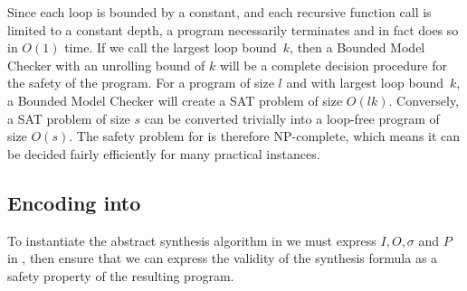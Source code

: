 \iffalse
Two example \newC programs are shown 
in Fig.~\ref{fig:c-}.

\begin{figure}
\begin{minipage}[scale=0.8]{0.45\linewidth}
 \begin{lstlisting}[language=c]
int count_bits(int x) {
  int i, ret = 0;
  
  for (i = 0; i < 32; i++)
    if (x & (1 << i))
      ret++;
  
  return ret;
}
 \end{lstlisting}
\end{minipage}
\begin{minipage}{0.54\linewidth}
 \begin{lstlisting}[language=C]
int common_factor(int A[10]) {
  int i, factor = nondet();

  for (i = 0; i < 10; i++)
    assume((A[i] % factor) == 0);

  assume(factor > 1);
  return factor;
}

 \end{lstlisting}
\end{minipage}

 \caption{Two \newC programs}
 \label{fig:c-}

\end{figure}
\fi

Since each loop is bounded by a constant, and each recursive function call is
limited to a constant depth, a \newC program necessarily terminates and in
fact does so in $O(1)$ time.  If we call the largest loop bound~$k$, then
a Bounded Model Checker with an unrolling bound of $k$ will be a complete
decision procedure for the safety of the program.  For a \newC program of
size $l$ and with largest loop bound~$k$, a Bounded Model Checker will
create a SAT problem of size $O(lk)$.  Conversely, a SAT problem
of size $s$ can be converted trivially into a loop-free \newC program
of size $O(s)$.  The safety problem for \newC is therefore NP-complete,
which means it can be decided fairly efficiently for many practical
instances.


\subsection{Encoding into \newC}
To instantiate the abstract synthesis algorithm in \newC we must express $I, O,
\sigma$ and $P$ in \newC, then ensure that we can express the validity of the
synthesis formula as a safety property of the resulting \newC program.


